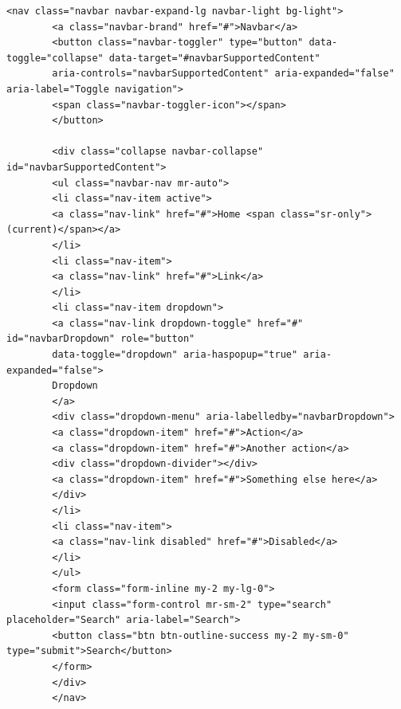 \documentclass[a4paper,twoside]{article}
\begin{document}
\begin{enumerate}
		\begin{lstlisting}[frame=single, basicstyle=\tiny] 
		<nav class="navbar navbar-expand-lg navbar-light bg-light">
		<a class="navbar-brand" href="#">Navbar</a>
		<button class="navbar-toggler" type="button" data-toggle="collapse" data-target="#navbarSupportedContent" 
		aria-controls="navbarSupportedContent" aria-expanded="false" aria-label="Toggle navigation">
		<span class="navbar-toggler-icon"></span>
		</button>
		
		<div class="collapse navbar-collapse" id="navbarSupportedContent">
		<ul class="navbar-nav mr-auto">
		<li class="nav-item active">
		<a class="nav-link" href="#">Home <span class="sr-only">(current)</span></a>
		</li>
		<li class="nav-item">
		<a class="nav-link" href="#">Link</a>
		</li>
		<li class="nav-item dropdown">
		<a class="nav-link dropdown-toggle" href="#" id="navbarDropdown" role="button" 
		data-toggle="dropdown" aria-haspopup="true" aria-expanded="false">
		Dropdown
		</a>
		<div class="dropdown-menu" aria-labelledby="navbarDropdown">
		<a class="dropdown-item" href="#">Action</a>
		<a class="dropdown-item" href="#">Another action</a>
		<div class="dropdown-divider"></div>
		<a class="dropdown-item" href="#">Something else here</a>
		</div>
		</li>
		<li class="nav-item">
		<a class="nav-link disabled" href="#">Disabled</a>
		</li>
		</ul>
		<form class="form-inline my-2 my-lg-0">
		<input class="form-control mr-sm-2" type="search" placeholder="Search" aria-label="Search">
		<button class="btn btn-outline-success my-2 my-sm-0" type="submit">Search</button>
		</form>
		</div>
		</nav>
		\end{lstlisting}
		

\end{enumerate}
\end{document}
